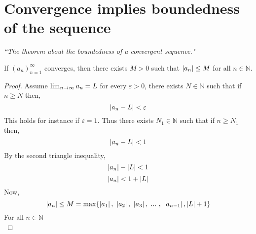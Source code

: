 \documentclass[12pt]{report}
\begin{document}
    \section{Convergence implies boundedness of the sequence}
    \label{Convergence of a bounded sequence}
    \textit{``The theorem about the boundedness of a convergent sequence."} \vspace{3mm}
    \begin{theorem}
        If \(\left(a_n\right)^\infty _{n=1}\) converges, then there exists \(M > 0\) such that \(\left| a_n \right| \leq M\) for all \(n \in \mathbb{N}\).
    \end{theorem}
    \begin{proof}
        Assume \(\lim_{n \to \infty} a_n = L\) for every \(\varepsilon > 0\), there exists \(N \in \mathbb{N}\) such that if \(n \geq N\) then,
        \[\left| a_n - L \right| < \varepsilon\]
        This holds for instance if \(\varepsilon = 1\). Thus there exists \(N_1 \in \mathbb{N}\) such that if \(n \geq N_1\) then,
        \[\left| a_n - L  \right| < 1\]
        By the second triangle inequality,
        \[\left| a_n \right| - \left| L \right| < 1\]
        \[\left| a_n \right| < 1+ \left| L \right|\]
        Now, 
        \[\left| a_n \right| \leq M = \max \{\left| a_1 \right|,~ \left| a_2 \right|,~ \left| a_3 \right|, ~ ... ~,~ \left| a_{n-1} \right|, \left| L \right| + 1  \}\]
        For all \(n \in \mathbb{N}\)\\
    \end{proof}    
\end{document}
